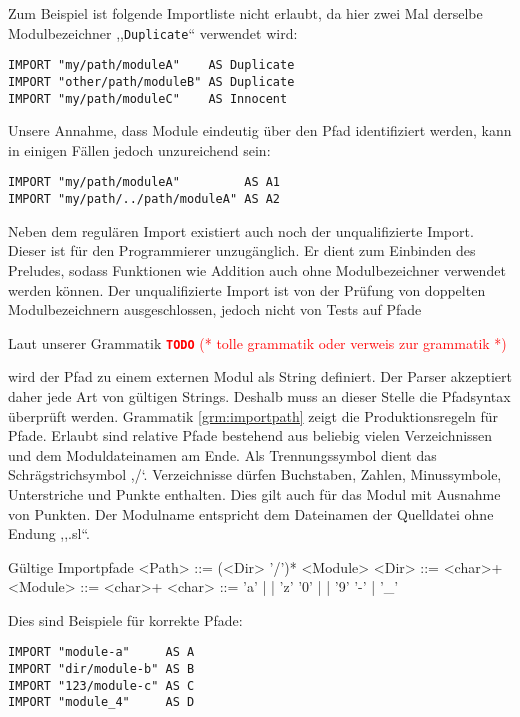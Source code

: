 \documentclass[runningheads]{llncs}
\newcommand{\TODO}[1]{ \textcolor{red}{\textbf{\texttt{\large{TODO}}} (* #1 *)}\par}
\begin{document}
Zum Beispiel ist folgende Importliste nicht erlaubt, da hier zwei Mal derselbe Modulbezeichner ,,\verb|Duplicate|`` verwendet wird:

\begin{verbatim}
IMPORT "my/path/moduleA"    AS Duplicate
IMPORT "other/path/moduleB" AS Duplicate
IMPORT "my/path/moduleC"    AS Innocent
\end{verbatim}

Unsere Annahme, dass Module eindeutig über den Pfad identifiziert werden, kann in einigen Fällen jedoch unzureichend sein:

\begin{verbatim}
IMPORT "my/path/moduleA"         AS A1
IMPORT "my/path/../path/moduleA" AS A2
\end{verbatim}

Neben dem regulären Import existiert auch noch der unqualifizierte Import. Dieser ist für den Programmierer unzugänglich. Er dient zum Einbinden des Preludes, sodass Funktionen wie Addition auch ohne Modulbezeichner verwendet werden können. Der unqualifizierte Import ist von der Prüfung von doppelten Modulbezeichnern ausgeschlossen, jedoch nicht von Tests auf Pfade

Laut unserer Grammatik \TODO{tolle grammatik oder verweis zur grammatik} wird der Pfad zu einem externen Modul als String definiert. Der Parser akzeptiert daher jede Art von gültigen Strings. Deshalb muss an dieser Stelle die Pfadsyntax überprüft werden. Grammatik \ref{grm:importpath} zeigt die Produktionsregeln für Pfade. Erlaubt sind relative Pfade bestehend aus beliebig vielen Verzeichnissen und dem Moduldateinamen am Ende. Als Trennungssymbol dient das Schrägstrichsymbol ,/`. Verzeichnisse dürfen Buchstaben, Zahlen, Minussymbole, Unterstriche und Punkte enthalten. Dies gilt auch für das Modul mit Ausnahme von Punkten. Der Modulname entspricht dem Dateinamen der Quelldatei ohne Endung ,,.sl``.

\begin{grammarfigure}{Gültige Importpfade}
  <Path>   ::= (<Dir> '/')* <Module>
  <Dir>    ::= <char>+
  <Module> ::= <char>+
  <char>   ::= 'a' | \cdots | 'z'
          \alt '0' | \cdots | '9'
          \alt '-' | '\_'
\end{grammarfigure}

Dies sind Beispiele für korrekte Pfade:

\begin{verbatim}
IMPORT "module-a"     AS A
IMPORT "dir/module-b" AS B
IMPORT "123/module-c" AS C
IMPORT "module_4"     AS D
\end{verbatim}
\end{document}
